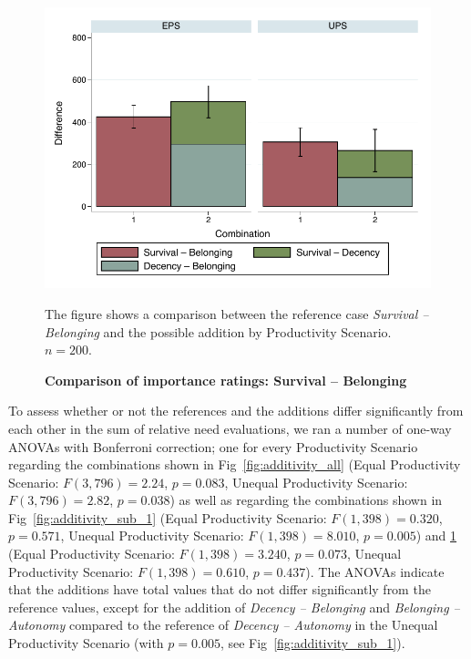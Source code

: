 \documentclass[10pt,letterpaper]{article}
\begin{document}
\begin{figure}[ht!]
   \includegraphics[width=\textwidth]{figures/figure_8.pdf}
   \caption{\bf Comparison of importance ratings: Survival -- Belonging}
   The figure shows a comparison between the reference case \textit{Survival -- Belonging} and the possible addition by Productivity Scenario. $n=200$.
   \label{fig:additivity_sub_2}
\end{figure}

To assess whether or not the references and the additions differ significantly from each other in the sum of relative need evaluations, we ran a number of one-way ANOVAs with Bonferroni correction; one for every Productivity Scenario regarding the combinations shown in Fig~\ref{fig:additivity_all} (Equal Productivity Scenario: $F(3,796)=2.24$, $p=0.083$, Unequal Productivity Scenario: $F(3,796)=2.82$, $p=0.038$) as well as regarding the combinations shown in Fig~\ref{fig:additivity_sub_1} (Equal Productivity Scenario: $F(1,398)=0.320$, $p=0.571$, Unequal Productivity Scenario: $F(1,398)=8.010$, $p=0.005$) and \ref{fig:additivity_sub_2} (Equal Productivity Scenario: $F(1,398)=3.240$, $p=0.073$, Unequal Productivity Scenario: $F(1,398)=0.610$, $p=0.437$).
The ANOVAs indicate that the additions have total values that do not differ significantly from the reference values, except for the addition of \textit{Decency -- Belonging} and \textit{Belonging -- Autonomy} compared to the reference of \textit{Decency -- Autonomy} in the Unequal Productivity Scenario (with $p=0.005$, see Fig~\ref{fig:additivity_sub_1}).
\end{document}
